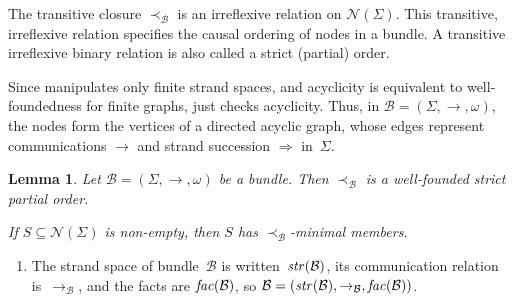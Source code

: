 \documentclass[12pt]{article}
\newcommand{\nodes}{\ensuremath{\mathcal{N}}}
\newcommand{\bun}{\ensuremath{\mathcal{B}}}
\newcommand{\ssp}{\Sigma}
\newcommand{\str}{\fn{str}}
\newcommand{\fac}{\fn{fac}}
\newcounter{running}[section]
\newenvironment{renumerate}{\begin{enumerate}%
\setcounter{enumi}{\value{running}}}%
{\setcounter{running}{\value{enumi}}\end{enumerate}}
\newtheorem{lemma}{Lemma}
\begin{document}
%
The transitive closure $\prec_{\bun}$ is an irreflexive relation on
$\nodes(\ssp)$.  This transitive, irreflexive relation specifies the
causal ordering of nodes in a bundle.  A transitive irreflexive binary
relation is also called a strict (partial) order.

Since {\cpsa} manipulates only finite strand spaces, and acyclicity is
equivalent to well-foundedness for finite graphs, {\cpsa} just checks
acyclicity.  Thus, in $\bun=(\ssp,\to,\omega)$, the nodes form the vertices
of a directed acyclic graph, whose edges represent communications
$\rightarrow$ and strand succession $\Rightarrow$ in~$\ssp$.
%
\begin{lemma}
  Let $\bun=(\ssp,\to,\omega)$ be a bundle.  Then $\prec_{\bun}$ is a
  well-founded strict partial order.

  If $S\subseteq\nodes(\ssp)$ is non-empty, then $S$ has
  $\prec_{\bun}$-minimal members.
\end{lemma}

\begin{renumerate}
  \item The strand space of bundle~{\bun} is written~$\str(\bun)$, its
    communication relation is~$\to_\bun$, and the facts are
    $\fac(\bun)$, so $\bun=(\str(\bun),\to_\bun,\fac(\bun))$.
\end{renumerate}
%
\end{document}
